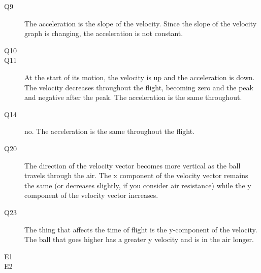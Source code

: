 \documentclass{exam}
\begin{document}
\begin{description}
\item[Q9]
The acceleration is the slope of the velocity.  Since the slope of the velocity graph is changing, the acceleration is not constant.

\item[Q10]

\item[Q11]
At the start of its motion, the velocity is up and the acceleration is down.  The velocity decreases throughout the
flight, becoming zero and the peak and negative after the peak.  The acceleration is the same throughout.

\item[Q14]
no.  The acceleration is the same throughout the flight.

\item[Q20]
The direction of the velocity vector becomes more vertical as the ball travels through the air.  The x component of the
velocity vector remains the same (or decreases slightly, if you consider air resistance) while the y component of the
velocity vector increases.

\item[Q23]
The thing that affects the time of flight is the y-component of the velocity.  The ball that goes higher has a greater y
velocity and is in the air longer.

\item[E1]
\begin{description*}
\item[a]
\[
  v = (10 \text{ m/s}^2) (0.8 \text{ s}) = 8 \text{ m/s}
\]

\item[b]
\[
  v = (10 \text{ m/s}^2) (1.6 \text{ s}) = 16 \text{ m/s}
\]
\end{description*}

\item[E2]
\begin{description*}
\item[a]
\[
  v = \frac{1}{2} (10 \text{ m/s}^s) (0.8 \text{ s})^2 = 3.2 \text{ m}
\]

\item[b]
\[
  v = \frac{1}{2} (10 \text{ m/s}^2) (1.6 \text{ s})^2 = 12.8 \text{ m}
\]


\end{description*}
\end{description}
\end{document}
